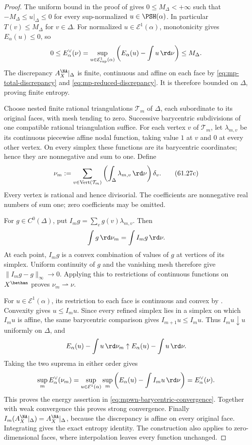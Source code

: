 \begin{proof}
The uniform bound in the proof of  gives $0\leq M_\Delta<+\infty$ such that $-M_\Delta\leq u|_\Delta\leq0$ for every sup-normalized $u\in\PSH(\alpha)$. In particular $T(v)\leq M_\Delta$ for $v\in\Delta$. For normalized $u\in\mathcal E^1(\alpha)$, monotonicity gives $E_\alpha(u)\leq0$, so
\[
 0\leq E_\alpha^\vee(\nu)
      =\sup_{u\in\mathcal E^1_{\sup}(\alpha)}\left(E_\alpha(u)-\int u\,\rd\nu\right)
      \leq M_\Delta.
\]
The discrepancy $A_X^{\NA}|_\Delta$ is finite, continuous and affine on each face by \eqref{eq:mp-total-discrepancy} and \eqref{eq:mp-reduced-discrepancy}. It is therefore bounded on $\Delta$, proving finite entropy.

Choose nested finite rational triangulations $\mathcal T_m$ of $\Delta$, each subordinate to its original faces, with mesh tending to zero. Successive barycentric subdivisions of one compatible rational triangulation suffice. For each vertex $v$ of $\mathcal T_m$, let $\lambda_{m,v}$ be its continuous piecewise affine nodal function, taking value $1$ at $v$ and $0$ at every other vertex. On every simplex these functions are its barycentric coordinates; hence they are nonnegative and sum to one. Define
\[
 \nu_m:=\sum_{v\in\operatorname{Vert}(\mathcal T_m)}
                  \left(\int_\Delta\lambda_{m,v}\,\rd\nu\right)\delta_v.
\tag{61.27c}\label{eq:mpwn-barycentric-measure}
\]
Every vertex is rational and hence divisorial. The coefficients are nonnegative real numbers of sum one; zero coefficients may be omitted.

For $g\in C^0(\Delta)$, put $I_mg=\sum_v g(v)\lambda_{m,v}$. Then
\[
                   \int g\,\rd\nu_m=\int I_mg\,\rd\nu.
\]
At each point, $I_mg$ is a convex combination of values of $g$ at vertices of its simplex. Uniform continuity of $g$ and the vanishing mesh therefore give $\|I_mg-g\|_\infty\to0$. Applying this to restrictions of continuous functions on $X^{\bethan}$ proves $\nu_m\rightharpoonup\nu$.

For $u\in\mathcal E^1(\alpha)$, its restriction to each face is continuous and convex by . Convexity gives $u\leq I_mu$. Since every refined simplex lies in a simplex on which $I_mu$ is affine, the same barycentric comparison gives $I_{m+1}u\leq I_mu$. Thus $I_mu\downarrow u$ uniformly on $\Delta$, and
\[
 E_\alpha(u)-\int u\,\rd\nu_m
       \uparrow E_\alpha(u)-\int u\,\rd\nu.
\]
Taking the two suprema in either order gives
\[
 \sup_m E_\alpha^\vee(\nu_m)
   =\sup_{u\in\mathcal E^1(\alpha)}\sup_m
       \left(E_\alpha(u)-\int I_mu\,\rd\nu\right)
   =E_\alpha^\vee(\nu).
\]
This proves the energy assertion in \eqref{eq:mpwn-barycentric-convergence}. Together with weak convergence this proves strong convergence. Finally $I_m(A_X^{\NA}|_\Delta)=A_X^{\NA}|_\Delta$, because the discrepancy is affine on every original face. Integrating gives the exact entropy identity. The construction also applies to zero-dimensional faces, where interpolation leaves every function unchanged.
\end{proof}

